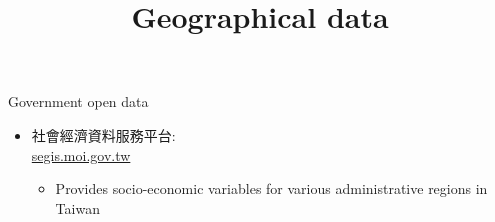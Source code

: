 \documentclass[hyperref={pdfpagelabels=false}]{beamer}
\begin{document}
\begin{frame}{Government open data}
	\begin{itemize} 
		\item 社會經濟資料服務平台: \\ \href{https://segis.moi.gov.tw/STATCloud/Profile}{segis.moi.gov.tw}  
			\begin{itemize} 
		
		
		\vspace{0.2cm}
		
            \item Provides socio-economic variables for various administrative regions in Taiwan

		 
			\end{itemize}
		
		
		
	\end{itemize}
\end{frame}








\title[]  
{Geographical data}


\author 
{}

\institute{}






\date
{}


\begin{frame}{}
	\titlepage
\end{frame}
\end{document}
